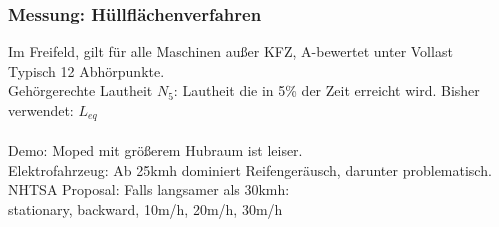 \documentclass[fs, footer]{latex4ei}
\begin{document}
\begin{multicols}{4}
{		
		\subsubsection{Messung: Hüllflächenverfahren}
		Im Freifeld, gilt für alle Maschinen außer KFZ, A-bewertet unter Vollast\\
		Typisch 12 Abhörpunkte.\\
		


		Gehörgerechte Lautheit $N_5$: Lautheit die in 5\% der Zeit erreicht wird.
		Bisher verwendet: $L_{eq}$\\
		\\
		Demo: Moped mit größerem Hubraum ist leiser.\\
		Elektrofahrzeug: Ab 25kmh dominiert Reifengeräusch, darunter problematisch.\\
		NHTSA Proposal: Falls langsamer als 30kmh:\\
		stationary, backward, 10m/h, 20m/h, 30m/h\\ 
}










\end{multicols}

\end{document}

